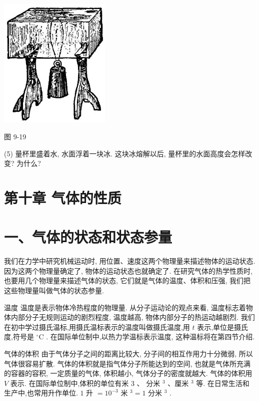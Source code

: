 \documentclass[10pt]{article}
\begin{document}
\begin{center}
\includegraphics[max width=0.4\textwidth]{images/01912d55-147c-70aa-b0e0-1782a122f948_277_484176.jpg}
\end{center}

图 9-19

(5) 量杯里盛着水, 水面浮着一块冰. 这块冰熔解以后, 量杯里的水面高度会怎样改变? 为什么?

\section*{第十章 气体的性质}

\section*{一、气体的状态和状态参量}

我们在力学中研究机械运动时, 用位置、速度这两个物理量来描述物体的运动状态. 因为这两个物理量确定了, 物体的运动状态也就确定了. 在研究气体的热学性质时, 也要用几个物理量来描述气体的状态, 它们就是气体的温度、体积和压强, 我们把这些物理量叫做气体的状态参量.

温度 温度是表示物体冷热程度的物理量. 从分子运动论的观点来看, 温度标志着物体内部分子无规则运动的剧烈程度, 温度越高, 物体内部分子的热运动越剧烈. 我们在初中学过摄氏温标,用摄氏温标表示的温度叫做摄氏温度,用 \(t\) 表示,单位是摄氏度,符号是 \({}^{ \circ }\mathrm{C}\) . 在国际单位制中,以热力学温标表示温度, 这种温标将在第四节介绍.

气体的体积 由于气体分子之间的距离比较大, 分子间的相互作用力十分微弱, 所以气体很容易扩散. 气体的体积就是指气体分子所能达到的空间, 也就是气体所充满的容器的容积, 一定质量的气体, 体积越小, 气体分子的密度就越大. 气体的体积用 \(V\) 表示. 在国际单位制中,体积的单位有米 3 、 分米 \({}^{3}\) 、厘米 \({}^{3}\) 等. 在日常生活和生产中,也常用升作单位. \(1\) 升 \(= {10}^{-3}\) 米 \({}^{3} = 1\) 分米 \({}^{3}\) .
\end{document}
